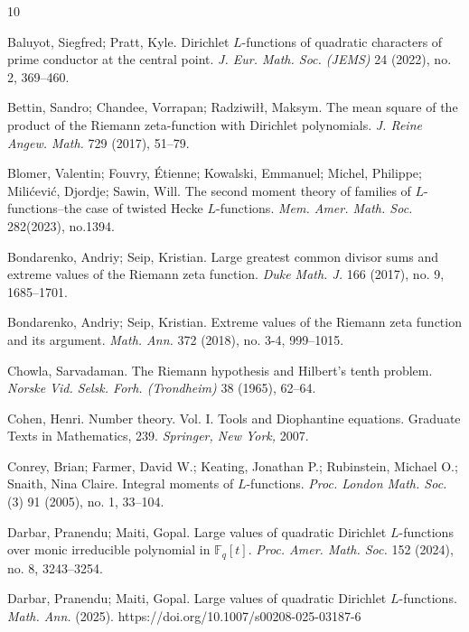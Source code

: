 \documentclass[12pt,reqno]{amsart}
\numberwithin{equation}{section}
\theoremstyle{plain}
\theoremstyle{definition}
\theoremstyle{remark}
\begin{document}
\begin{thebibliography}{10}

Baluyot, Siegfred; Pratt, Kyle.
Dirichlet $L$-functions of quadratic characters of prime conductor at the central point.
\emph{J. Eur. Math. Soc. (JEMS)} 24 (2022), no. 2, 369--460.

Bettin, Sandro; Chandee, Vorrapan; Radziwi{\l \l}, Maksym.
The mean square of the product of the Riemann zeta-function with Dirichlet polynomials.
\emph{J. Reine Angew. Math.} 729 (2017), 51--79.

Blomer, Valentin; Fouvry, \'{E}tienne; Kowalski, Emmanuel; Michel, Philippe; Mili\'{c}evi\'{c}, Djordje; Sawin, Will.
The second moment theory of families of $L$-functions--the case of twisted Hecke $L$-functions.
\emph{Mem. Amer. Math. Soc.} 282(2023), no.1394.

Bondarenko, Andriy; Seip, Kristian.
Large greatest common divisor sums and extreme values of the Riemann zeta function. \emph{Duke Math. J.} 166 (2017), no. 9, 1685--1701.

Bondarenko, Andriy; Seip, Kristian.
Extreme values of the Riemann zeta function and its argument.
\emph{Math. Ann.} 372 (2018), no. 3-4, 999--1015.

Chowla, Sarvadaman.
The Riemann hypothesis and Hilbert's tenth problem.
\emph{Norske Vid. Selsk. Forh. (Trondheim) } 38 (1965), 62--64.

Cohen, Henri.
Number theory. Vol. I. Tools and Diophantine equations.
Graduate Texts in Mathematics, 239. \emph{Springer, New York,} 2007.

Conrey, Brian; Farmer, David W.; Keating, Jonathan P.; Rubinstein, Michael O.; Snaith, Nina Claire.
Integral moments of $L$-functions.
\emph{Proc. London Math. Soc.} (3) 91 (2005), no. 1, 33--104.

Darbar, Pranendu; Maiti, Gopal.
Large values of quadratic Dirichlet $L$-functions over monic irreducible polynomial in $\mathbb{F}_q[t]$.
\emph{Proc. Amer. Math. Soc.} 152 (2024), no. 8, 3243--3254.

Darbar, Pranendu; Maiti, Gopal.
Large values of quadratic Dirichlet
$L$-functions.
\emph{Math. Ann.} (2025). https://doi.org/10.1007/s00208-025-03187-6


\end{thebibliography}
\end{document}
